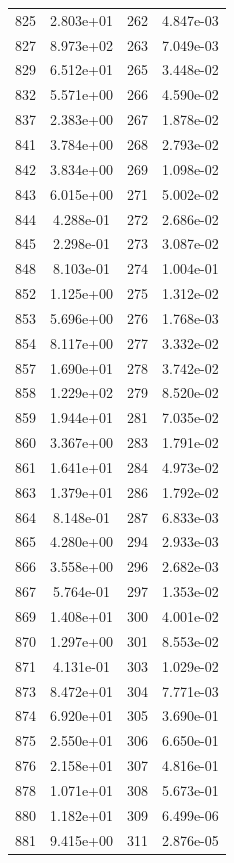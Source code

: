 \documentclass[12pt]{article}
\begin{document}
\begin{longtable}{@{}cccc@{}}
825 & 2.803e+01 & 262 & 4.847e-03 \\
827 & 8.973e+02 & 263 & 7.049e-03 \\
829 & 6.512e+01 & 265 & 3.448e-02 \\
832 & 5.571e+00 & 266 & 4.590e-02 \\
837 & 2.383e+00 & 267 & 1.878e-02 \\
841 & 3.784e+00 & 268 & 2.793e-02 \\
842 & 3.834e+00 & 269 & 1.098e-02 \\
843 & 6.015e+00 & 271 & 5.002e-02 \\
844 & 4.288e-01 & 272 & 2.686e-02 \\
845 & 2.298e-01 & 273 & 3.087e-02 \\
848 & 8.103e-01 & 274 & 1.004e-01 \\
852 & 1.125e+00 & 275 & 1.312e-02 \\
853 & 5.696e+00 & 276 & 1.768e-03 \\
854 & 8.117e+00 & 277 & 3.332e-02 \\
857 & 1.690e+01 & 278 & 3.742e-02 \\
858 & 1.229e+02 & 279 & 8.520e-02 \\
859 & 1.944e+01 & 281 & 7.035e-02 \\
860 & 3.367e+00 & 283 & 1.791e-02 \\
861 & 1.641e+01 & 284 & 4.973e-02 \\
863 & 1.379e+01 & 286 & 1.792e-02 \\
864 & 8.148e-01 & 287 & 6.833e-03 \\
865 & 4.280e+00 & 294 & 2.933e-03 \\
866 & 3.558e+00 & 296 & 2.682e-03 \\
867 & 5.764e-01 & 297 & 1.353e-02 \\
869 & 1.408e+01 & 300 & 4.001e-02 \\
870 & 1.297e+00 & 301 & 8.553e-02 \\
871 & 4.131e-01 & 303 & 1.029e-02 \\
873 & 8.472e+01 & 304 & 7.771e-03 \\
874 & 6.920e+01 & 305 & 3.690e-01 \\
875 & 2.550e+01 & 306 & 6.650e-01 \\
876 & 2.158e+01 & 307 & 4.816e-01 \\
878 & 1.071e+01 & 308 & 5.673e-01 \\
880 & 1.182e+01 & 309 & 6.499e-06 \\
881 & 9.415e+00 & 311 & 2.876e-05 \\

\end{longtable}
\end{document}
